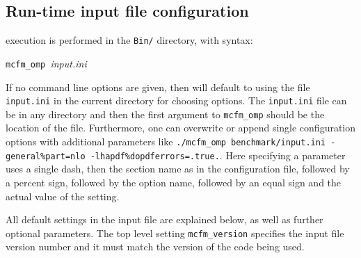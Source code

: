\subsection{Run-time input file configuration}

\MCFM{} execution is performed in the {\tt Bin/} directory,
with syntax:
\begin{center}
	{\tt mcfm\_omp }{\it input.ini}
\end{center}
If no command line options are given, then \MCFM{} will default
to using the file {\tt input.ini} in the current directory for
choosing options. The \texttt{input.ini} file can be in any directory and
then the first argument to \texttt{mcfm\_omp} should be the location
of the file. Furthermore, one can overwrite or append single
configuration options with additional parameters like 
\texttt{./mcfm\_omp benchmark/input.ini -general\%part=nlo -lhapdf\%dopdferrors=.true.}.
Here specifying a parameter uses a single dash, then the section name as in the configuration file, followed
by a percent sign, followed by the option name, followed by an equal sign and the actual value of the setting.

All default settings in the input file are explained below, as well as further optional parameters.
The top level setting \texttt{mcfm\_version} specifies the input file version number and it must  match the version of 
the code being used.
\clearpage

